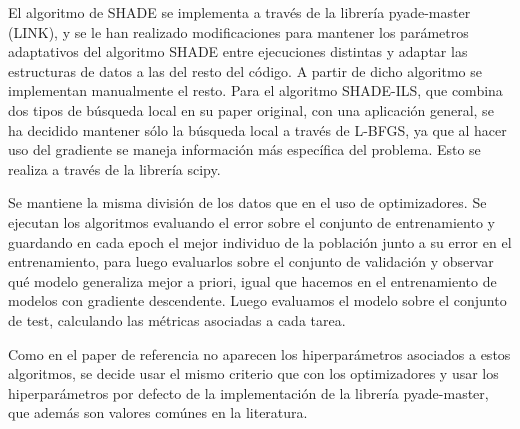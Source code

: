 El algoritmo de SHADE se implementa a través de la librería pyade-master (LINK), y se le han realizado modificaciones para mantener los parámetros adaptativos del algoritmo SHADE entre ejecuciones distintas y adaptar las estructuras de datos a las del resto del código. A partir de dicho algoritmo se implementan manualmente el resto. Para el algoritmo SHADE-ILS, que combina dos tipos de búsqueda local en su paper original, con una aplicación general, se ha decidido mantener sólo la búsqueda local a través de L-BFGS, ya que al hacer uso del gradiente se maneja información más específica del problema. Esto se realiza a través de la librería scipy.

Se mantiene la misma división de los datos que en el uso de optimizadores. Se ejecutan los algoritmos evaluando el error sobre el conjunto de entrenamiento y guardando en cada epoch el mejor individuo de la población junto a su error en el entrenamiento, para luego evaluarlos sobre el conjunto de validación y observar qué modelo generaliza mejor a priori, igual que hacemos en el entrenamiento de modelos con gradiente descendente. Luego evaluamos el modelo sobre el conjunto de test, calculando las métricas asociadas a cada tarea.

Como en el paper de referencia no aparecen los hiperparámetros asociados a estos algoritmos, se decide usar el mismo criterio que con los optimizadores y usar los hiperparámetros por defecto de la implementación de la librería pyade-master, que además son valores comúnes en la literatura. 




